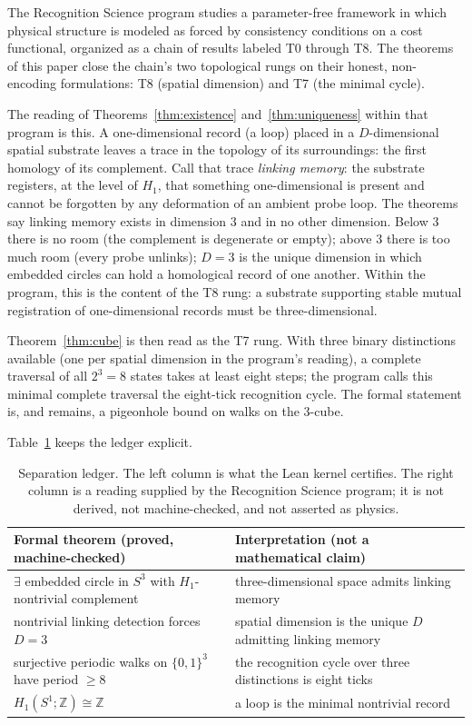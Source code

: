 \documentclass[11pt]{article}
\theoremstyle{definition}
\newcommand{\Z}{\mathbb{Z}}
\newcommand{\Sph}[1]{S^{#1}}
\begin{document}
The Recognition Science program \cite{rs-cost, rs-geometry, rs-convex, rs-coherent, rs-hessian} studies a parameter-free framework in which physical structure is modeled as forced by consistency conditions on a cost functional, organized as a chain of results labeled T0 through T8. The theorems of this paper close the chain's two topological rungs on their honest, non-encoding formulations: T8 (spatial dimension) and T7 (the minimal cycle).

The reading of Theorems~\ref{thm:existence} and~\ref{thm:uniqueness} within that program is this. A one-dimensional record (a loop) placed in a $D$-dimensional spatial substrate leaves a trace in the topology of its surroundings: the first homology of its complement. Call that trace \emph{linking memory}: the substrate registers, at the level of $H_1$, that something one-dimensional is present and cannot be forgotten by any deformation of an ambient probe loop. The theorems say linking memory exists in dimension $3$ and in no other dimension. Below $3$ there is no room (the complement is degenerate or empty); above $3$ there is too much room (every probe unlinks); $D = 3$ is the unique dimension in which embedded circles can hold a homological record of one another. Within the program, this is the content of the T8 rung: a substrate supporting stable mutual registration of one-dimensional records must be three-dimensional.

Theorem~\ref{thm:cube} is then read as the T7 rung. With three binary distinctions available (one per spatial dimension in the program's reading), a complete traversal of all $2^3 = 8$ states takes at least eight steps; the program calls this minimal complete traversal the eight-tick recognition cycle. The formal statement is, and remains, a pigeonhole bound on walks on the $3$-cube.

Table~\ref{tab:separation} keeps the ledger explicit.

\begin{table}[ht]
\centering
\small
\renewcommand{\arraystretch}{1.45}
\begin{tabular}{@{}p{}p{}@{}}
\toprule
\textbf{Formal theorem (proved, machine-checked)} & \textbf{Interpretation (not a mathematical claim)} \\
\midrule
$\exists$ embedded circle in $\Sph{3}$ with $H_1$-nontrivial complement & three-dimensional space admits linking memory \\
nontrivial linking detection forces $D = 3$ & spatial dimension is the unique $D$ admitting linking memory \\
surjective periodic walks on $\{0,1\}^3$ have period $\geq 8$ & the recognition cycle over three distinctions is eight ticks \\
$H_1(S^1;\Z) \cong \Z$ & a loop is the minimal nontrivial record \\
\bottomrule
\end{tabular}
\caption{Separation ledger. The left column is what the Lean kernel certifies. The right column is a reading supplied by the Recognition Science program; it is not derived, not machine-checked, and not asserted as physics.}
\label{tab:separation}
\end{table}
\end{document}
